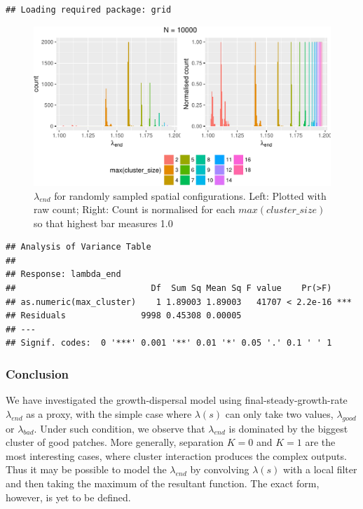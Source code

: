 \documentclass[a4paperpaper,]{article}
\begin{document}
\begin{verbatim}
## Loading required package: grid
\end{verbatim}

\begin{figure}
\centering
\includegraphics{index_files/figure-latex/vis__max_cluster-1.pdf}
\caption{\label{fig:vis__max_cluster} \(\lambda_{end}\) for randomly
sampled spatial configurations. Left: Plotted with raw count; Right:
Count is normalised for each \(max(cluster\_size)\) so that highest bar
measures 1.0}
\end{figure}

\begin{verbatim}
## Analysis of Variance Table
## 
## Response: lambda_end
##                           Df  Sum Sq Mean Sq F value    Pr(>F)    
## as.numeric(max_cluster)    1 1.89003 1.89003   41707 < 2.2e-16 ***
## Residuals               9998 0.45308 0.00005                      
## ---
## Signif. codes:  0 '***' 0.001 '**' 0.01 '*' 0.05 '.' 0.1 ' ' 1
\end{verbatim}

\subsubsection{Conclusion}\label{conclusion}

We have investigated the growth-dispersal model using
final-steady-growth-rate \(\lambda_{end}\) as a proxy, with the simple
case where \(\lambda(s)\) can only take two values, \(\lambda_{good}\)
or \(\lambda_{bad}\). Under such condition, we observe that
\(\lambda_{end}\) is dominated by the biggest cluster of good patches.
More generally, separation \(K=0\) and \(K=1\) are the most interesting
cases, where cluster interaction produces the complex outputs. Thus it
may be possible to model the \(\lambda_{end}\) by convolving
\(\lambda(s)\) with a local filter and then taking the maximum of the
resultant function. The exact form, however, is yet to be defined.
\end{document}
